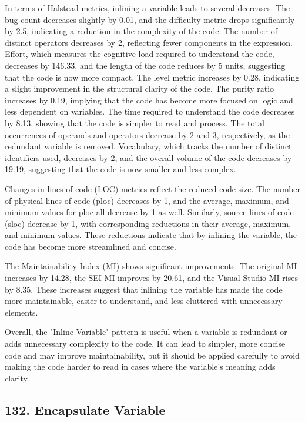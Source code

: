 In terms of Halstead metrics, inlining a variable leads to several decreases. The bug count decreases slightly by 0.01, and the difficulty metric drops significantly by 2.5, indicating a reduction in the complexity of the code. The number of distinct operators decreases by 2, reflecting fewer components in the expression. Effort, which measures the cognitive load required to understand the code, decreases by 146.33, and the length of the code reduces by 5 units, suggesting that the code is now more compact. The level metric increases by 0.28, indicating a slight improvement in the structural clarity of the code. The purity ratio increases by 0.19, implying that the code has become more focused on logic and less dependent on variables. The time required to understand the code decreases by 8.13, showing that the code is simpler to read and process. The total occurrences of operands and operators decrease by 2 and 3, respectively, as the redundant variable is removed. Vocabulary, which tracks the number of distinct identifiers used, decreases by 2, and the overall volume of the code decreases by 19.19, suggesting that the code is now smaller and less complex.

Changes in lines of code (LOC) metrics reflect the reduced code size. The number of physical lines of code (ploc) decreases by 1, and the average, maximum, and minimum values for ploc all decrease by 1 as well. Similarly, source lines of code (sloc) decrease by 1, with corresponding reductions in their average, maximum, and minimum values. These reductions indicate that by inlining the variable, the code has become more streamlined and concise.

The Maintainability Index (MI) shows significant improvements. The original MI increases by 14.28, the SEI MI improves by 20.61, and the Visual Studio MI rises by 8.35. These increases suggest that inlining the variable has made the code more maintainable, easier to understand, and less cluttered with unnecessary elements.

Overall, the "Inline Variable" pattern is useful when a variable is redundant or adds unnecessary complexity to the code. It can lead to simpler, more concise code and may improve maintainability, but it should be applied carefully to avoid making the code harder to read in cases where the variable's meaning adds clarity.

\subsection{132. Encapsulate Variable}

